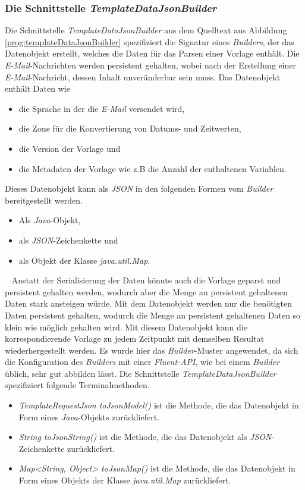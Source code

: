 \subsubsection{Die Schnittstelle \emph{TemplateDataJsonBuilder}}
\label{sec:templateDataJsonBuilder}
Die Schnittstelle \emph{TemplateDataJsonBuilder} aus dem Quelltext aus Abbildung \ref{prog:templateDataJsonBuilder} spezifiziert die Signatur eines \emph{Builders}, der das Datenobjekt erstellt, welches die Daten für das Parsen einer Vorlage enthält. Die \emph{E-Mail}-Nachrichten werden persistent gehalten, wobei nach der Erstellung einer \emph{E-Mail}-Nachricht, dessen Inhalt unveränderbar sein muss. Das Datenobjekt enthält Daten wie
\begin{itemize}
	\item die Sprache in der die \emph{E-Mail} versendet wird,
	\item die Zone für die Konvertierung von Datums- und Zeitwerten,
	\item die Version der Vorlage und 
	\item die Metadaten der Vorlage wie z.B die Anzahl der enthaltenen Variablen.
\end{itemize} 
Dieses Datenobjekt kann als \emph{JSON} in den folgenden Formen vom \emph{Builder} bereitgestellt werden.
\begin{itemize}
	\item Als \emph{Java}-Objekt,
	\item als \emph{JSON}-Zeichenkette und
	\item als Objekt der Klasse \emph{java.util.Map}.
\end{itemize}
\ \newline
Anstatt der Serialisierung der Daten könnte auch die Vorlage geparst und persistent gehalten werden, wodurch aber die Menge an persistent gehaltenen Daten stark ansteigen würde. Mit dem Datenobjekt werden nur die benötigten Daten persistent gehalten, wodurch die Menge an persistent gehaltenen Daten so klein wie möglich gehalten wird. Mit diesem Datenobjekt kann die korrespondierende Vorlage zu jedem Zeitpunkt mit demselben Resultat wiederhergestellt werden.
\newline
\newline
Es wurde hier das \emph{Builder}-Muster angewendet, da sich die Konfiguration des \emph{Builders} mit einer \emph{Fluent-API}, wie bei einem \emph{Builder} üblich, sehr gut abbilden lässt. Die Schnittstelle \emph{TemplateDataJsonBuilder} spezifiziert folgende Terminalmethoden.
\begin{itemize}
	\item\emph{TemplateRequestJson toJsonModel()}
	\newline
	ist die Methode, die das Datenobjekt in Form eines \emph{Java}-Objekts zurückliefert.
	\item\emph{String toJsonString()}
	\newline
	ist die Methode, die das Datenobjekt als \emph{JSON}-Zeichenkette zurückliefert.
	\item\emph{Map<String, Object> toJsonMap()}
	\newline
	ist die Methode, die das Datenobjekt in Form eines Objekts der Klasse \emph{java.util.Map} zurückliefert.
\end{itemize} 
\ \newpage

